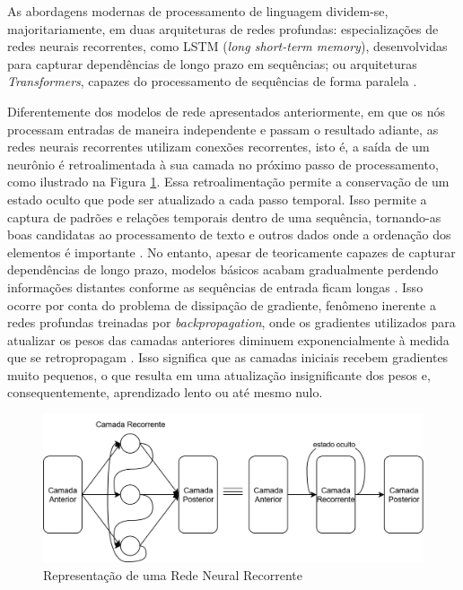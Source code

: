 As abordagens modernas de processamento de linguagem dividem-se, majoritariamente, em duas arquiteturas de redes profundas: especializações de redes neurais recorrentes, como LSTM (\textit{long short-term memory}), desenvolvidas para capturar dependências de longo prazo em sequências; ou arquiteturas \textit{Transformers}, capazes do processamento de sequências de forma paralela \cite{nlp2}.

Diferentemente dos modelos de rede apresentados anteriormente, em que os nós processam entradas de maneira independente e passam o resultado adiante, as redes neurais recorrentes utilizam conexões recorrentes, isto é, a saída de um neurônio é retroalimentada à sua camada no próximo passo de processamento, como ilustrado na Figura \ref{fig:rnn}. Essa retroalimentação permite a conservação de um estado oculto que pode ser atualizado a cada passo temporal. Isso permite a captura de padrões e relações temporais dentro de uma sequência, tornando-as boas candidatas ao processamento de texto e outros dados onde a ordenação dos elementos é importante \cite{rnn}. No entanto, apesar de teoricamente capazes de capturar dependências de longo prazo, modelos básicos acabam gradualmente perdendo informações distantes conforme as sequências de entrada ficam longas \cite{nlp}. Isso ocorre por conta do problema de dissipação de gradiente, fenômeno inerente a redes profundas treinadas por \textit{backpropagation}, onde os gradientes utilizados para atualizar os pesos das camadas anteriores diminuem exponencialmente à medida que se retropropagam \cite{deeplearningbook}. Isso significa que as camadas iniciais recebem gradientes muito pequenos, o que resulta em uma atualização insignificante dos pesos e, consequentemente, aprendizado lento ou até mesmo nulo.

\begin{figure}[H]
	\caption{\label{fig:rnn}Representação de uma Rede Neural Recorrente}
    \begin{center}
    \includegraphics[width=1\linewidth]{images/rnn.png}
	\end{center}
\end{figure}

